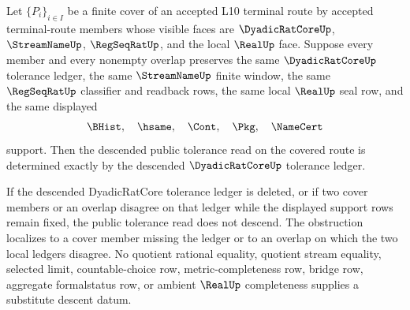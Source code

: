 \begin{theorem}
\label{thm:dyadicratcore-terminal-tolerance-finite-cover-descent}
Let $\{P_i\}_{i \in I}$ be a finite cover of an accepted L10 terminal route by accepted terminal-route members whose visible faces are $\DyadicRatCoreUp$, $\StreamNameUp$, $\RegSeqRatUp$, and the local $\RealUp$ face. Suppose every member and every nonempty overlap preserves the same $\DyadicRatCoreUp$ tolerance ledger, the same $\StreamNameUp$ finite window, the same $\RegSeqRatUp$ classifier and readback rows, the same local $\RealUp$ seal row, and the same displayed
$$
\BHist,\quad \hsame,\quad \Cont,\quad \Pkg,\quad \NameCert
$$
support. Then the descended public tolerance read on the covered route is determined exactly by the descended $\DyadicRatCoreUp$ tolerance ledger.

If the descended DyadicRatCore tolerance ledger is deleted, or if two cover members or an overlap disagree on that ledger while the displayed support rows remain fixed, the public tolerance read does not descend. The obstruction localizes to a cover member missing the ledger or to an overlap on which the two local ledgers disagree. No quotient rational equality, quotient stream equality, selected limit, countable-choice row, metric-completeness row, bridge row, aggregate formalstatus row, or ambient $\RealUp$ completeness supplies a substitute descent datum.
\end{theorem}

